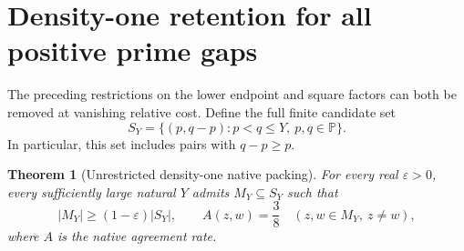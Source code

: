 \documentclass[11pt]{article}
\newtheorem{theorem}{Theorem}[section]
\begin{document}
\section{Density-one retention for all positive prime gaps}
\label{sec:native-full-density}

The preceding restrictions on the lower endpoint and square factors can
both be removed at vanishing relative cost. Define the full finite
candidate set
\[
 S_Y=\{(p,q-p):p<q\le Y,\ p,q\in\mathbb P\}.
\]
In particular, this set includes pairs with \(q-p\ge p\).

\begin{theorem}[Unrestricted density-one native packing]
\label{thm:native-full-density}
For every real \(\varepsilon>0\), every sufficiently large natural
\(Y\) admits \(M_Y\subseteq S_Y\) such that
\[
 |M_Y|\ge(1-\varepsilon)|S_Y|,
 \qquad
 A(z,w)=\frac38\quad(z,w\in M_Y,\ z\ne w),
\]
where \(A\) is the native agreement rate.
\end{theorem}
\end{document}
